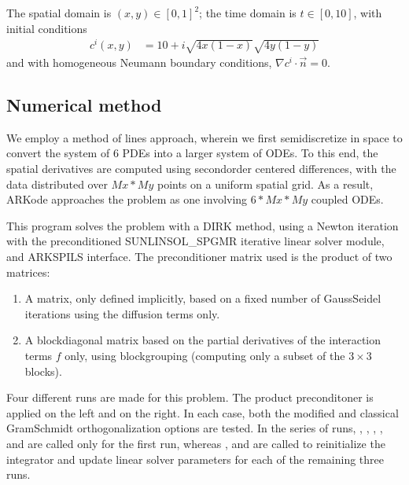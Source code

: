 \documentclass[letterpaper,10pt,english]{sphinxmanual}
\begin{document}
\sphinxAtStartPar
The spatial domain is \((x,y) \in [0, 1]^2\); the time domain is
\(t \in [0,10]\), with initial conditions
\begin{equation*}
\begin{split}c^i(x,y) &=  10 + i \sqrt{4x(1-x)}\sqrt{4y(1-y)}\end{split}
\end{equation*}
\sphinxAtStartPar
and with homogeneous Neumann boundary conditions,
\(\nabla c^i \cdot \vec{n} = 0\).


\subsection{Numerical method}
\label{\detokenize{c_serial:id32}}
\sphinxAtStartPar
We employ a method of lines approach, wherein we first semi\sphinxhyphen{}discretize
in space to convert the system of 6 PDEs into a larger system of ODEs.
To this end, the spatial derivatives are computed using second\sphinxhyphen{}order
centered differences, with the data distributed over \(Mx*My\)
points on a uniform spatial grid.  As a result, ARKode approaches the
problem as one involving \(6*Mx*My\) coupled ODEs.

\sphinxAtStartPar
This program solves the problem with a DIRK method, using a Newton
iteration with the preconditioned SUNLINSOL\_SPGMR iterative linear
solver module, and ARKSPILS interface.  The preconditioner matrix used
is the product of two matrices:
\begin{enumerate}
%
\item {} 
\sphinxAtStartPar
A matrix, only defined implicitly, based on a fixed number of
Gauss\sphinxhyphen{}Seidel iterations using the diffusion terms only.

\item {} 
\sphinxAtStartPar
A block\sphinxhyphen{}diagonal matrix based on the partial derivatives of the
interaction terms \(f\) only, using block\sphinxhyphen{}grouping (computing
only a subset of the \(3\times3\) blocks).

\end{enumerate}

\sphinxAtStartPar
Four different runs are made for this problem.  The product
preconditoner is applied on the left and on the right.  In each case,
both the modified and classical Gram\sphinxhyphen{}Schmidt orthogonalization options
are tested.  In the series of runs, , ,
, ,
 and  are called
only for the first run, whereas ,
 and  are called to
re\sphinxhyphen{}initialize the integrator and update linear solver parameters for
each of the remaining three runs.
\end{document}
